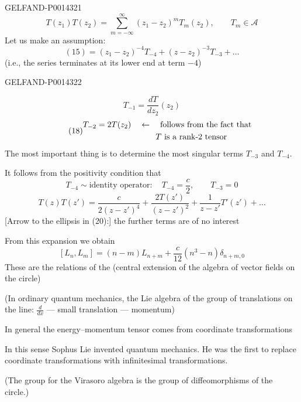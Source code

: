 \begin{GelfandAdjacentEvidence}{GELFAND-P001432}{1}
\begin{equation*}
\tag{15}
T(z_1)T(z_2)=\sum_{m=-\infty}^{\infty}(z_1-z_2)^mT_m(z_2),\qquad
T_m\in\mathcal A
\end{equation*}
Let us make an assumption:
\begin{equation*}
\tag{16}
(15)=(z_1-z_2)^{-4}T_{-4}+(z-z_2)^{-3}T_{-3}+\ldots
\end{equation*}
(i.e., the series terminates at its lower end at term \(-4\))
\end{GelfandAdjacentEvidence}
\begin{GelfandAdjacentEvidence}{GELFAND-P001432}{2}

\begin{equation*}
\tag{17}
T_{-1}=\frac{dT}{dz_2}(z_2)
\end{equation*}
\begin{equation*}
\tag{18}
\begin{aligned}
T_{-2}=2T(z_2)&\quad\leftarrow\quad\text{follows from the fact that}\\
&\hphantom{\quad\leftarrow\quad}\text{\(T\) is a rank-2 tensor}
\end{aligned}
\end{equation*}
The most important thing is to determine the most singular terms \(T_{-3}\) and \(T_{-4}\).

It follows from the positivity condition that
\begin{equation*}
\tag{19}
T_{-4}\sim\text{identity operator}:\quad T_{-4}=\frac c2,\qquad T_{-3}=0
\end{equation*}
\begin{equation*}
\tag{20}
T(z)T(z')=\frac{c}{2(z-z')^4}+\frac{2T(z')}{(z-z')^2}
+\frac{1}{z-z'}T'(z')+\ldots
\end{equation*}
[Arrow to the ellipsis in (20):] the further terms are of no interest

From this expansion we obtain
\begin{equation*}
\tag{21}
\boxed{[L_n,L_m]=(n-m)L_{n+m}+\frac{c}{12}(n^3-n)\delta_{n+m,0}}
\end{equation*}
These are the relations of the  (central extension of the algebra of vector fields on the circle)

(In ordinary quantum mechanics, the Lie algebra of the group of translations on the line: \(\frac{d}{dx}\) — small translation — momentum)

In general the energy–momentum tensor comes from coordinate transformations

In this sense Sophus Lie invented quantum mechanics. He was the first to replace coordinate transformations with infinitesimal transformations.

(The group for the Virasoro algebra is the group of diffeomorphisms of the circle.)

\end{GelfandAdjacentEvidence}
